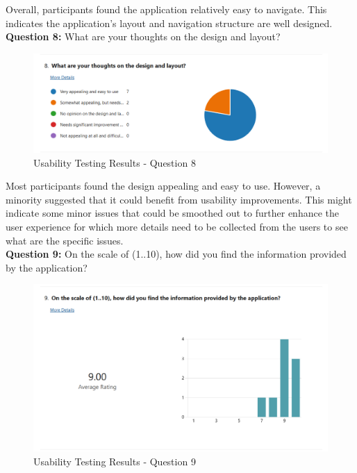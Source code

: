 \begin{justify}
\vspace{0.25cm}
\newendline Overall, participants found the application relatively easy to navigate. This indicates the application’s layout and navigation structure are well designed.\\

\vspace{0.25cm}
\newendline \textbf{Question 8:} What are your thoughts on the design and layout?

\begin{figure}[H]
    \centerline{\includegraphics[width=150mm,scale=1]{figures/implementation_and_testing/testing/MUT/answers/Answers (8).png}}
    \caption{Usability Testing Results - Question 8}
    \label{Usability Testing Results - Question 8}
\end{figure}

\vspace{0.25cm}
\newendline Most participants found the design appealing and easy to use. However, a minority suggested that it could benefit from usability improvements. This might indicate some minor issues that could be smoothed out to further enhance the user experience for which more details need to be collected from the users to see what are the specific issues.\\

\vspace{0.25cm}
\newendline \textbf{Question 9:} On the scale of (1..10), how did you find the information provided by the application? 

\begin{figure}[H]
    \centerline{\includegraphics[width=150mm,scale=1]{figures/implementation_and_testing/testing/MUT/answers/Answers (9).png}}
    \caption{Usability Testing Results - Question 9}
    \label{Usability Testing Results - Question 9}
\end{figure}


\end{justify}
